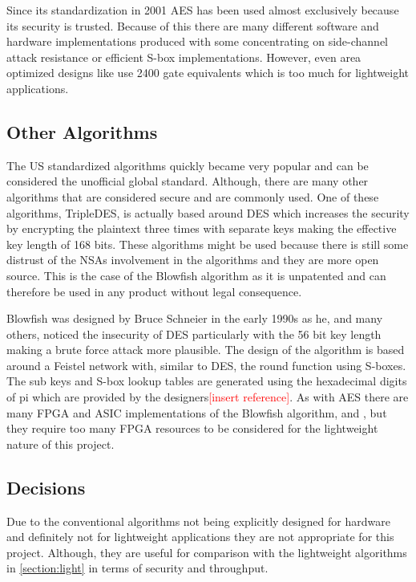 \documentclass[12pt,twoside,a4paper]{report}
\begin{document}
	Since its standardization in 2001 AES has been used almost exclusively because its security is trusted. Because of this there are many different software and hardware implementations produced with some concentrating on side-channel attack resistance\cite{Strachacki2008} or efficient S-box implementations\cite{Gomes2016}. However, even area optimized designs like \cite{Moradi2011} use 2400 gate equivalents which is too much for lightweight applications.
    
	\subsection{Other Algorithms}
	The US standardized algorithms quickly became very popular and can be considered the unofficial global standard. Although, there are many other algorithms that are considered secure and are commonly used. One of these algorithms, TripleDES, is actually based around DES which increases the security by encrypting the plaintext three times with separate keys making the effective key length of 168 bits. These algorithms might be used because there is still some distrust of the NSAs involvement in the algorithms and they are more open source. This is the case of the Blowfish algorithm as it is unpatented and can therefore be used in any product without legal consequence.
    
	Blowfish was designed by Bruce Schneier in the early 1990s as he, and many others, noticed the insecurity of DES particularly with the 56 bit key length making a brute force attack more plausible\cite{BruceSchneier1994}. The design of the algorithm is based around a Feistel network with, similar to DES, the round function using S-boxes. The sub keys and S-box lookup tables are generated using the hexadecimal digits of pi which are provided by the designers\textcolor{red}{[insert reference]}. As with AES there are many FPGA and ASIC implementations of the Blowfish algorithm, \cite{Chatterjee2014} and \cite{Prasetyo2014}, but they require too many FPGA resources to be considered for the lightweight nature of this project.
    
	\subsection{Decisions}
	Due to the conventional algorithms not being explicitly designed for hardware and definitely not for lightweight applications they are not appropriate for this project. Although, they are useful for comparison with the lightweight algorithms in \autoref{section:light} in terms of security and throughput.
    
\end{document}
